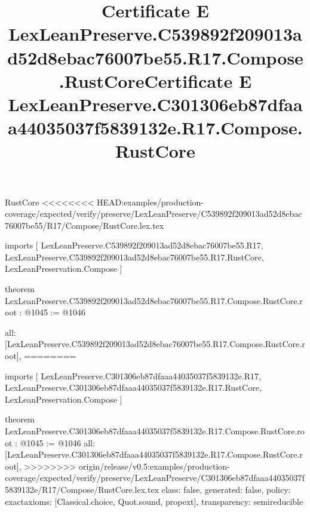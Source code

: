 \begin{lexlean}{RustCore}
<<<<<<<< HEAD:examples/production-coverage/expected/verify/preserve/LexLeanPreserve/C539892f209013ad52d8ebac76007be55/R17/Compose/RustCore.lex.tex
\title{Certificate E LexLeanPreserve.C539892f209013ad52d8ebac76007be55.R17.Compose.RustCore}
\begin{coremodule}
imports [
  LexLeanPreserve.C539892f209013ad52d8ebac76007be55.R17,
  LexLeanPreserve.C539892f209013ad52d8ebac76007be55.R17.RustCore,
  LexLeanPreservation.Compose
]

theorem LexLeanPreserve.C539892f209013ad52d8ebac76007be55.R17.Compose.RustCore.root : @1045 := @1046 {
  all: [LexLeanPreserve.C539892f209013ad52d8ebac76007be55.R17.Compose.RustCore.root],
========
\title{Certificate E LexLeanPreserve.C301306eb87dfaaa44035037f5839132e.R17.Compose.RustCore}
\begin{coremodule}
imports [
  LexLeanPreserve.C301306eb87dfaaa44035037f5839132e.R17,
  LexLeanPreserve.C301306eb87dfaaa44035037f5839132e.R17.RustCore,
  LexLeanPreservation.Compose
]

theorem LexLeanPreserve.C301306eb87dfaaa44035037f5839132e.R17.Compose.RustCore.root : @1045 := @1046 {
  all: [LexLeanPreserve.C301306eb87dfaaa44035037f5839132e.R17.Compose.RustCore.root],
>>>>>>>> origin/release/v0.5:examples/production-coverage/expected/verify/preserve/LexLeanPreserve/C301306eb87dfaaa44035037f5839132e/R17/Compose/RustCore.lex.tex
  class: false,
  generated: false,
  policy: exact{axioms: [Classical.choice, Quot.sound, propext]},
  transparency: semireducible
}


\end{coremodule}}
\end{coremodule}
\end{lexlean}

